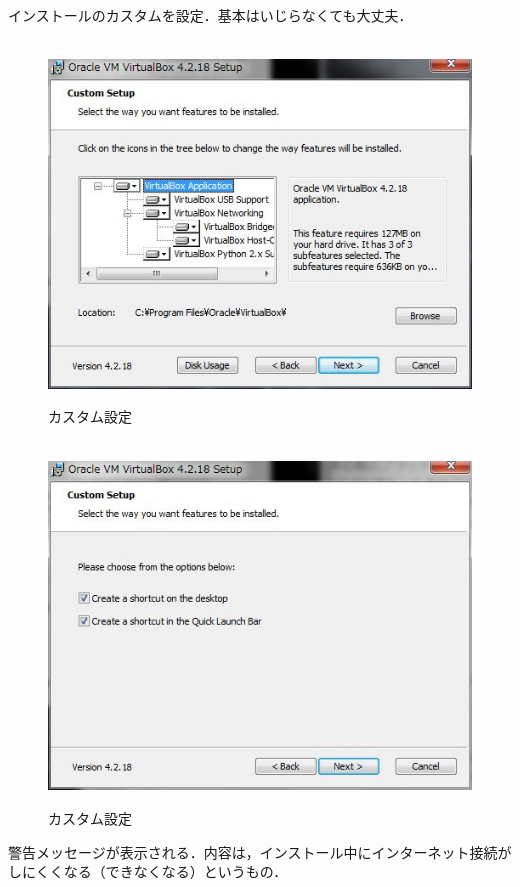インストールのカスタムを設定．基本はいじらなくても大丈夫．

\begin{figure}[htbp]
\centering　
\includegraphics[width=13cm]{VB3.png}
\caption{カスタム設定}
\end{figure}

\begin{figure}[htbp]
\centering　
\includegraphics[width=13cm]{VB4.png}
\caption{カスタム設定}
\end{figure}

警告メッセージが表示される．内容は，インストール中にインターネット接続がしにくくなる（できなくなる）というもの．

